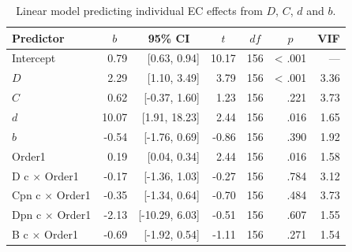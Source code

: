 \documentclass[
  man,floatsintext]{apa6}
\begin{document}
\begin{table}[tbp]

\begin{center}
\begin{threeparttable}

\caption{\label{tab:unnamed-chunk-25}Linear model predicting individual EC effects from $D$, $C$, $d$ and $b$.}

\begin{tabular}{lrrrrrr}
\toprule
Predictor & \multicolumn{1}{c}{$b$} & \multicolumn{1}{c}{95\% CI} & \multicolumn{1}{c}{$t$} & \multicolumn{1}{c}{$\mathit{df}$} & \multicolumn{1}{c}{$p$} & \multicolumn{1}{c}{VIF}\\
\midrule
Intercept & 0.79 & {}[0.63, 0.94] & 10.17 & 156 & < .001 & ---\\
$D$ & 2.29 & {}[1.10, 3.49] & 3.79 & 156 & < .001 & 3.36\\
$C$ & 0.62 & {}[-0.37, 1.60] & 1.23 & 156 & .221 & 3.73\\
$d$ & 10.07 & {}[1.91, 18.23] & 2.44 & 156 & .016 & 1.65\\
$b$ & -0.54 & {}[-1.76, 0.69] & -0.86 & 156 & .390 & 1.92\\
Order1 & 0.19 & {}[0.04, 0.34] & 2.44 & 156 & .016 & 1.58\\
D c $\times$ Order1 & -0.17 & {}[-1.36, 1.03] & -0.27 & 156 & .784 & 3.12\\
Cpn c $\times$ Order1 & -0.35 & {}[-1.34, 0.64] & -0.70 & 156 & .484 & 3.73\\
Dpn c $\times$ Order1 & -2.13 & {}[-10.29, 6.03] & -0.51 & 156 & .607 & 1.55\\
B c $\times$ Order1 & -0.69 & {}[-1.92, 0.54] & -1.11 & 156 & .271 & 1.54\\
\bottomrule
\end{tabular}

\end{threeparttable}
\end{center}

\end{table}
\end{document}
